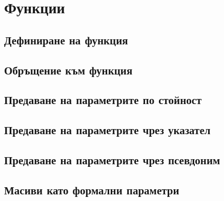 \documentclass[fleqn,12pt]{article}
\begin{document}
\section{Функции}
\subsection{Дефиниране на функция}
\subsection{Обръщение към функция}
\subsection{Предаване на параметрите по стойност}
\subsection{Предаване на параметрите чрез указател}
\subsection{Предаване на параметрите чрез псевдоним}
\subsection{Масиви като формални параметри}
\end{document}
